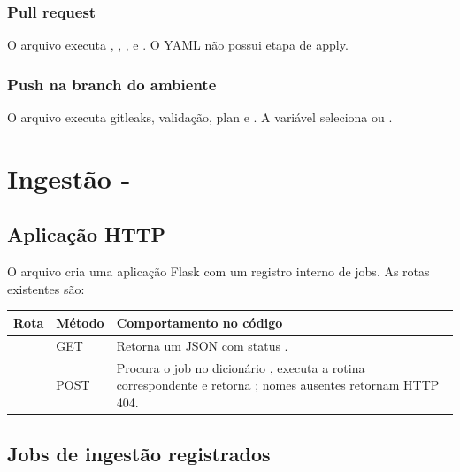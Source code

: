 \documentclass[11pt,a4paper]{article}
\begin{document}
\subsubsection{Pull request}

O arquivo  executa , ,
,  e .
O YAML não possui etapa de apply.

\subsubsection{Push na branch do ambiente}

O arquivo  executa gitleaks, validação, plan e
. A variável  seleciona  ou
.

\section{Ingestão - }

\subsection{Aplicação HTTP}

O arquivo  cria uma aplicação Flask com um registro interno de
jobs. As rotas existentes são:

\begin{tabularx}{\textwidth}{L{38mm}L{24mm}Y}
\toprule
\textbf{Rota} & \textbf{Método} & \textbf{Comportamento no código} \\
\midrule
{} & GET & Retorna um JSON com status . \\
 & POST & Procura o job no dicionário , executa a rotina correspondente e retorna ; nomes ausentes retornam HTTP 404. \\
\bottomrule
\end{tabularx}

\subsection{Jobs de ingestão registrados}
\end{document}
